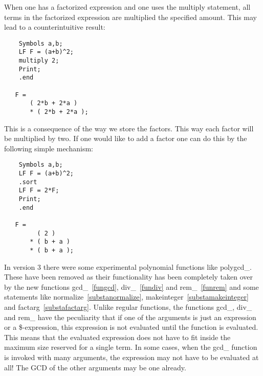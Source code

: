 \noindent When one has a factorized expression and one uses the multiply 
statement, all terms in the factorized expression are multiplied the 
specified amount. This may lead to a counterintuitive result:
\begin{verbatim}
    Symbols a,b;
    LF F = (a+b)^2;
    multiply 2;
    Print;
    .end

   F =
       ( 2*b + 2*a )
       * ( 2*b + 2*a );
\end{verbatim}
This is a consequence of the way we store the factors. This way each factor 
will be multiplied by two. If one would like to add a factor one can do 
this by the following simple mechanism:
\begin{verbatim}
    Symbols a,b;
    LF F = (a+b)^2;
    .sort
    LF F = 2*F;
    Print;
    .end

   F =
         ( 2 )
       * ( b + a )
       * ( b + a );
\end{verbatim}

\noindent In version 3 there were some experimental polynomial functions 
like polygcd\_. These have been 
removed as their functionality has been completely taken over by the new 
functions gcd\_~\ref{fungcd}, div\_~\ref{fundiv} and rem\_~\ref{funrem} and 
some statements like normalize~\ref{substanormalize}, 
makeinteger~\ref{substamakeinteger} and factarg~\ref{substafactarg}. Unlike 
regular functions, the functions gcd\_, div\_ and rem\_ have the 
peculiarity that if one of the arguments is just an expression or a 
\$-expression, this expression is not evaluated until the function is 
evaluated. This means that the evaluated expression does not have to fit 
inside the maximum size reserved for a single term. In some cases, when the 
gcd\_ function is invoked with many arguments, the expression may not have 
to be evaluated at all! The GCD of the other arguments may be one already.


